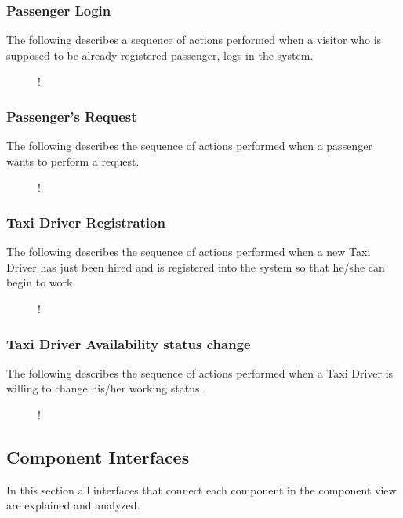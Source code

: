 \subsubsection{Passenger Login}
The following describes a sequence of actions performed when a visitor who is supposed to be already registered passenger, logs in the system. 
\begin{figure}[H]
	\small
	\centering
	\resizebox{6in}
	{!}{}
	\end{figure}
\break
\subsubsection{Passenger's Request}
The following describes the sequence of actions performed when a passenger wants to perform a request. 
\begin{figure}[H]
	\small
	\centering
	\resizebox{6in}
	{!}{}
\end{figure}
\break
\subsubsection{Taxi Driver Registration}
The following describes the sequence of actions performed when a new Taxi Driver has just been hired and is registered into the system so that he/she can begin to work.
\begin{figure}[H]
	\small
	\centering
	\resizebox{6in}
	{!}{}
\end{figure}
\break
\subsubsection{Taxi Driver Availability status change}
The following describes the sequence of actions performed when a Taxi Driver is willing to change his/her working status.
\begin{figure}[H]
	\small
	\centering
	\resizebox{6in}
	{!}{}
\end{figure}
\subsection{Component Interfaces}
\label{sec:interfaces}
In this section all interfaces that connect each component in the component view are explained and analyzed.
